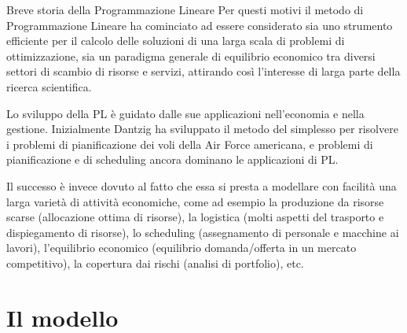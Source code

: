 \documentclass{beamer}
\begin{document}
\begin{frame}[allowframebreaks]{Breve storia della Programmazione Lineare}
Per questi motivi il metodo di Programmazione Lineare ha cominciato
ad essere considerato sia uno strumento efficiente per il calcolo
delle soluzioni di una larga scala di problemi di ottimizzazione,
sia un paradigma generale di equilibrio economico tra diversi settori
di scambio di risorse e servizi, attirando così l'interesse di larga
parte della ricerca scientifica.

\framebreak

Lo sviluppo della PL è guidato dalle sue applicazioni
nell'economia e nella gestione. Inizialmente Dantzig ha sviluppato
il metodo del simplesso per risolvere i problemi di pianificazione
dei voli della Air Force americana, e problemi di pianificazione e
di scheduling ancora dominano le applicazioni di PL.

\framebreak

Il successo è invece dovuto al fatto che essa si presta
a modellare con facilità una larga varietà di attività economiche,
come ad esempio la produzione da risorse scarse (allocazione ottima
di risorse), la logistica (molti aspetti del trasporto e dispiegamento
di risorse), lo scheduling (assegnamento di personale e macchine ai
lavori), l'equilibrio economico (equilibrio domanda/offerta in un
mercato competitivo), la copertura dai rischi (analisi di portfolio),
etc.
\end{frame}

\section{Il modello}
\end{document}
